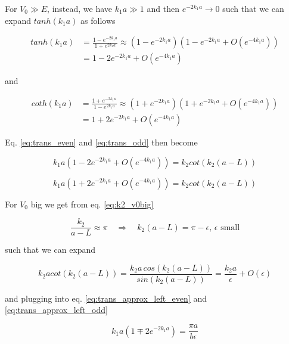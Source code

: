 \documentclass{article}
\begin{document}
For \(V_0 \gg E \), instead, we have \(k_1a \gg 1\) and then \(e^{-2k_1a} \rightarrow 0\) such that we can expand \(tanh(k_1a)\) as follows

\begin{align}
tanh(k_1a) & = \frac{1-e^{-2k_1a}}{1+e^{2k_1a}} \approx \left(1-e^{-2k_1a}\right) \left(1-e^{-2k_1a} + O\left(e^{-4k_1a}\right) \right) \nonumber \\
& = 1-2e^{-2k_1a} + O\left(e^{-4k_1a}\right)
\end{align}

and 

\begin{align}
coth(k_1a) & = \frac{1+e^{-2k_1a}}{1-e^{2k_1a}} \approx \left(1+e^{-2k_1a}\right) \left(1+e^{-2k_1a} + O\left(e^{-4k_1a}\right) \right) \nonumber \\
& = 1+2e^{-2k_1a} + O\left(e^{-4k_1a}\right)
\end{align}

Eq. \eqref{eq:trans_even} and \eqref{eq:trans_odd} then become

\begin{equation}
\label{eq:trans_approx_left_even}
k_1a \left( 1-2e^{-2k_1a} + O\left(e^{-4k_1a}\right) \right) = k_2cot(k_2(a-L))
\end{equation}

\begin{equation}
\label{eq:trans_approx_left_odd}
k_1a \left( 1+2e^{-2k_1a} + O\left(e^{-4k_1a}\right) \right) = k_2cot(k_2(a-L))
\end{equation}

For \(V_0\) big we get from eq. \eqref{eq:k2_v0big}

\begin{equation}
\frac{k_2}{a-L} \approx \pi \quad \Rightarrow \quad k_2(a-L) = \pi - \epsilon, \, \epsilon \text{ small}
\end{equation}

such that we can expand

\begin{equation}
k_2a cot(k_2(a-L)) = \frac{k_2a \, cos(k_2(a-L))}{sin(k_2(a-L))} = \frac{k_2a}{\epsilon} + O(\epsilon)
\end{equation}

and plugging into eq. \eqref{eq:trans_approx_left_even} and \eqref{eq:trans_approx_left_odd}

\begin{equation*}
k_1a \left(1 \mp 2e^{-2k_1a} \right) = \frac{\pi a}{b \epsilon}
\end{equation*}
\end{document}
